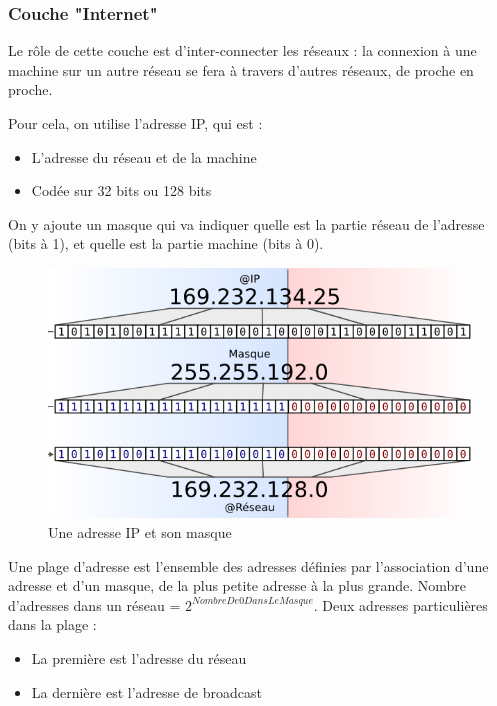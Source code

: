 \documentclass{beamer}
\begin{document}
\begin{frame}[allowframebreaks]
  \frametitle{Couche "Internet"}

    Le rôle de cette couche est d'inter-connecter les réseaux : la connexion à une machine sur un autre réseau se fera à travers d'autres réseaux, de proche en proche. \newline
    
    Pour cela, on utilise l'adresse IP, qui est :
    \begin{itemize}
        \item L'adresse du réseau et de la machine
        \item Codée sur 32 bits ou 128 bits
    \end{itemize}
    
    On y ajoute un masque qui va indiquer quelle est la partie réseau de l'adresse (bits à 1), et quelle est la partie machine (bits à 0).
    \framebreak
    
    \begin{figure}[h]
        \includegraphics[scale=0.5]{2-Adresse_IP}
        \caption{Une adresse IP et son masque}
    \end{figure}
    \framebreak
    
    Une plage d'adresse est l'ensemble des adresses définies par l'association d'une adresse et d'un masque, de la plus petite adresse à la plus grande. \newline
    Nombre d'adresses dans un réseau =  $2^{NombreDe0DansLeMasque}$. \newline
    Deux adresses particulières dans la plage :
    \begin{itemize}
        \item La première est l'adresse du réseau
        \item La dernière est l'adresse de broadcast
    \end{itemize}
    \framebreak
    

\end{frame}
\end{document}

